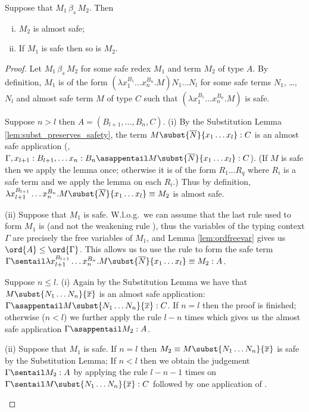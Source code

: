 \begin{lemma}
\label{lem:betas_preserves_safety}
Suppose that $M_1\, \beta_s\, M_2$. Then
\begin{enumerate}[(i)]
  \item $M_2$ is almost safe;
  \item If $M_1$ is safe then so is $M_2$.
\end{enumerate}
\end{lemma}
\begin{proof}
Let $M_1\, \beta_s\, M_2$ for some safe redex $M_1$ and term $M_2$ of type $A$. By definition, $M_1$ is of the form $(\lambda x_1^{B_1} \ldots x_n^{B_n} . M) N_1 \ldots N_l $ for some safe terms $N_1$, \ldots, $N_l$ and almost safe term $M$ of type $C$ such that $(\lambda x_1^{B_1} \ldots x_n^{B_n} . M)$ is safe.
\begin{compactitem}[-]
\item
Suppose $n>l$ then $A = (B_{l+1}, \ldots, B_n, C)$.
(i) By the Substitution Lemma
\ref{lem:subst_preserves_safety}, the term $M\subst{\overline{N}}{x_1
\ldots x_l} : C$ is an almost safe application (\ie, $\Gamma, x_{l+1}:B_{l+1}, \ldots x_n :B_{n}\asappentail M\subst{\overline{N}}{x_1
\ldots x_l} : C$). (If $M$ is safe then we apply the lemma once; otherwise it is of the form $R_1 \ldots R_q$ where $R_i$ is a safe term and we apply the lemma on each $R_i$.)
Thus by definition, $\lambda x_{l+1}^{B_{l+1}} \ldots x_n^{B_n} . M\subst{\overline{N}}{x_1
\ldots x_l} \equiv M_2$ is almost safe.

(ii) Suppose that $M_1$ is safe. W.l.o.g.~we can assume that the last rule used to form  $M_1$ is  (and not the weakening rule
), thus the variables of the typing context $\Gamma$ are precisely the free variables of $M_1$, and Lemma \ref{lem:ordfreevar} gives us $\ord{A} \leq \ord{\Gamma}$. This allows us to use the rule  to form the safe term $\Gamma
\sentail \lambda x_{l+1}^{B_{l+1}} \ldots x_n^{B_n} . M\subst{\overline{N}}{x_1
\ldots x_l} \equiv M_2 : A$.

\item Suppose $n \leq l$. (i) Again by the Substitution Lemma
we have that $M\subst{N_1 \ldots N_n}{\overline{x}}$ is an almost safe application: $\Gamma \asappentail M\subst{N_1 \ldots N_n}{\overline{x}} : C$. If $n=l$ then the proof is finished; otherwise ($n<l$) we further apply the rule  $l-n$ times which gives us the almost safe application $\Gamma \asappentail M_2 :A$.

(ii) Suppose that $M_1$ is safe.  If $n=l$ then $M_2\equiv M\subst{N_1 \ldots N_n}{\overline{x}}$ is safe by the Substitution Lemma;
If $n<l$ then we obtain the judgement $\Gamma \sentail M_2 :A$ by
applying the rule  $l-n-1$ times on $\Gamma \sentail M\subst{N_1 \ldots N_n}{\overline{x}} : C$ followed by one application of .
\qedhere
\end{compactitem}
\end{proof}

